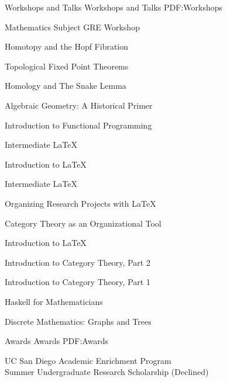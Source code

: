 \documentclass[letterpaper,MMMyyyy,nonstopmode]{simpleresumecv}
\begin{document}
\begin{Body}
\Section
{Workshops and Talks}
{Workshops and Talks}
{PDF:Workshops}

\BulletItem
Mathematics Subject GRE Workshop
\hfill {}

\BulletItem
Homotopy and the Hopf Fibration
\hfill {}

\BulletItem
Topological Fixed Point Theorems
\hfill {}

\BigGap

\BulletItem
Homology and The Snake Lemma
\hfill {}

\BulletItem
Algebraic Geometry: A Historical Primer
\hfill {}

\BulletItem
Introduction to Functional Programming
\hfill {}

\BulletItem
Intermediate \LaTeX
\hfill {}

\BulletItem
Introduction to \LaTeX
\hfill {}

\BulletItem
Intermediate \LaTeX
\hfill {}

\BulletItem
Organizing Research Projects with \LaTeX
\hfill {}

\BulletItem
Category Theory as an Organizational Tool
\hfill {}

\BigGap

\BulletItem
Introduction to \LaTeX
\hfill {}

\BulletItem
Introduction to Category Theory, Part 2
\hfill {}

\BulletItem
Introduction to Category Theory, Part 1
\hfill {}

\BulletItem
Haskell for Mathematicians
\hfill {}

\BulletItem
Discrete Mathematics: Graphs and Trees
\hfill {}


\Section
{Awards}
{Awards}
{PDF:Awards}

\BulletItem
UC San Diego Academic Enrichment Program \\
Summer Undergraduate Research Scholarship (Declined)
\hfill{}


\end{Body}
\end{document}
